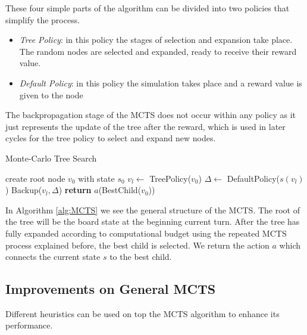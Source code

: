 \documentclass{ba-kecs}
\begin{document}
These four simple parts of the algorithm can be divided into two policies that simplify the process.
\begin{itemize}
\item \textit{Tree Policy}: in this policy the stages of selection and expansion take place. The random nodes are selected and expanded, ready to receive their reward value.
\item \textit{Default Policy}: in this policy the simulation takes place and a reward value is given to the node 
\end{itemize}
The backpropagation stage of the MCTS does not occur within any policy as it just represents the update of the tree after the reward, which is used in later cycles for the tree policy to select and expand new nodes.



\begin{algorithm}
    \caption{Monte-Carlo Tree Search}
    \label{alg:MCTS}
    \begin{algorithmic}
            \State create root node $v_0$ with state $s_0$
                \State $v_l \gets$ TreePolicy($v_0$)
                \State $ \Delta \gets$ DefaultPolicy($s(v_l)$)
                \State Backup($v_l, \Delta$)
            \EndWhile\label{}
            \State \textbf{return} $a$(BestChild($v_0$))
        \EndProcedure
    \end{algorithmic}
\end{algorithm}

In Algorithm \ref{alg:MCTS} we see the general structure of the MCTS. The root of the tree will be the board state at the beginning current turn. After the tree has fully expanded according to computational budget using the repeated MCTS process explained before, the best child is selected. We return the action $a$ which connects the current state $s$ to the best child.
\subsection{Improvements on General MCTS}
Different heuristics can be used on top the MCTS algorithm to enhance its performance.
\end{document}
